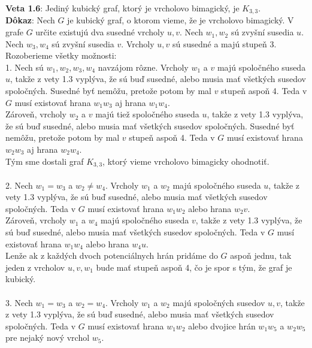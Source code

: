\documentclass[12pt]{article}
\begin{document}
\textbf{Veta 1.6}: Jediný kubický graf, ktorý je vrcholovo bimagický, je $K_{3,3}$. \\

\textbf{Dôkaz}: Nech $G$ je kubický graf, o ktorom vieme, že je vrcholovo bimagický. V grafe $G$ určite existujú dva susedné vrcholy $u,v$. Nech $w_1, w_2$ sú zvyšní susedia $u$. Nech $w_3, w_4$ sú zvyšní susedia $v$. Vrcholy $u,v$ sú susedné a majú stupeň 3. Rozoberieme všetky možnosti: \\

1. Nech sú $w_1, w_2, w_3, w_4$ navzájom rôzne. Vrcholy $w_1$ a $v$ majú spoločného suseda $u$, takže z vety 1.3 vyplýva, že sú buď susedné, alebo musia mať všetkých susedov spoločných. Susedné byť nemôžu, pretože potom by mal $v$ stupeň aspoň 4. Teda v $G$ musí existovať hrana $w_1 w_3$ aj hrana $w_1 w_4$. \\

Zároveň, vrcholy $w_2$ a $v$ majú tiež spoločného suseda $u$, takže z vety 1.3 vyplýva, že sú buď susedné, alebo musia mať všetkých susedov spoločných. Susedné byť nemôžu, pretože potom by mal $v$ stupeň aspoň 4. Teda v $G$ musí existovať hrana $w_2 w_3$ aj hrana $w_2 w_4$. \\

Tým sme dostali graf $K_{3,3}$, ktorý vieme vrcholovo bimagicky ohodnotiť. \\\\

2. Nech $w_1 = w_3$ a $w_2 \neq w_4$. Vrcholy $w_1$ a $w_2$ majú spoločného suseda $u$, takže z vety 1.3 vyplýva, že sú buď susedné, alebo musia mať všetkých susedov spoločných. Teda v $G$ musí existovať hrana $w_1 w_2$ alebo hrana $w_2 v$. \\

Zároveň, vrcholy $w_1$ a $w_4$ majú spoločného suseda $v$, takže z vety 1.3 vyplýva, že sú buď susedné, alebo musia mať všetkých susedov spoločných. Teda v $G$ musí existovať hrana $w_1 w_4$ alebo hrana $w_4 u$. \\

Lenže ak z každých dvoch potenciálnych hrán pridáme do $G$ aspoň jednu, tak jeden z vrcholov $u, v, w_1$ bude mať stupeň aspoň 4, čo je spor s tým, že graf je kubický. \\\\

3. Nech $w_1 = w_3$ a $w_2 = w_4$. Vrcholy $w_1$ a $w_2$ majú spoločných susedov $u,v$, takže z vety 1.3 vyplýva, že sú buď susedné, alebo musia mať všetkých susedov spoločných. Teda v $G$ musí existovať hrana $w_1 w_2$ alebo dvojice hrán $w_1 w_5$ a $w_2 w_5$ pre nejaký nový vrchol $w_5$. \\
\end{document}
